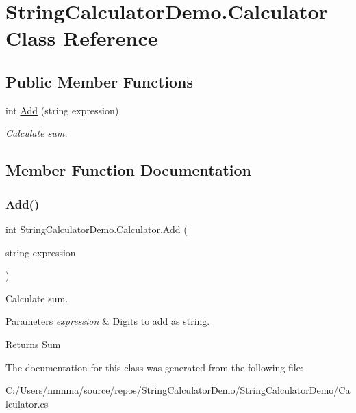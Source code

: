 \hypertarget{class_string_calculator_demo_1_1_calculator}{}\section{String\+Calculator\+Demo.\+Calculator Class Reference}
\label{class_string_calculator_demo_1_1_calculator}
\subsection*{Public Member Functions}
\begin{DoxyCompactItemize}
\item 
int \hyperlink{class_string_calculator_demo_1_1_calculator_aa8959c36fb3a4470ff96ea0c1c4348df}{Add} (string expression)
\begin{DoxyCompactList}\small\item\em Calculate sum. \end{DoxyCompactList}\end{DoxyCompactItemize}


\subsection{Member Function Documentation}
\mbox{\label{class_string_calculator_demo_1_1_calculator_aa8959c36fb3a4470ff96ea0c1c4348df}} 
\subsubsection{\texorpdfstring{Add()}{Add()}}
{\footnotesize\ttfamily int String\+Calculator\+Demo.\+Calculator.\+Add (\begin{DoxyParamCaption}\item[{string}]{expression }\end{DoxyParamCaption})}



Calculate sum. 


\begin{DoxyParams}{Parameters}
{\em expression} & Digits to add as string.\\
\hline
\end{DoxyParams}
\begin{DoxyReturn}{Returns}
Sum
\end{DoxyReturn}


The documentation for this class was generated from the following file\+:\begin{DoxyCompactItemize}
\item 
C\+:/\+Users/nmnma/source/repos/\+String\+Calculator\+Demo/\+String\+Calculator\+Demo/Calculator.\+cs\end{DoxyCompactItemize}
